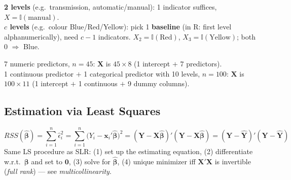 \begin{example}
    \textbf{2 levels} (e.g.\ transmission, automatic/manual): 1
    indicator suffices, $X=\mathbb{I}(\text{manual})$.
    \\ \textbf{$c$ levels} (e.g.\ colour Blue/Red/Yellow): pick 1
    \textbf{baseline} (in R: first level alphanumerically), need
    $c-1$ indicators. $X_2=\mathbb{I}(\text{Red})$, $X_3=\mathbb{I}(\text{Yellow})$;
    both 0 $\Rightarrow$ Blue.
\end{example}

\begin{example}\label{ex:dim}
    7 numeric predictors, $n=45$: $\mathbf{X}$ is $45\times8$ (1
    intercept $+$ 7 predictors). \\ 1 continuous predictor $+$ 1
    categorical predictor with 10 levels, $n=100$: $\mathbf{X}$ is
    $100\times11$ (1 intercept $+$ 1 continuous $+$ 9 dummy columns).
\end{example}


\subsection{Estimation via Least Squares}

\begin{definition}
    \[RSS(\hat{\boldsymbol\beta}) = \sum_{i=1}^n\hat\epsilon_i^2
    = \sum_{i=1}^n\big(Y_i-\mathbf{x}_i'\hat{\boldsymbol\beta}\big)^2
    = (\mathbf{Y}-\mathbf{X}\hat{\boldsymbol\beta})'(\mathbf{Y}-\mathbf{X}\hat{\boldsymbol\beta})
    = (\mathbf{Y}-\hat{\mathbf{Y}})'(\mathbf{Y}-\hat{\mathbf{Y}})\]
    Same LS procedure as SLR: (1) set up the estimating equation, (2)
    differentiate w.r.t.\ $\boldsymbol\beta$ and set to $\mathbf{0}$,
    (3) solve for $\hat{\boldsymbol\beta}$, (4) unique minimizer iff
    $\mathbf{X}'\mathbf{X}$ is invertible (\emph{full rank}) --- see
    \emph{multicollinearity}.
\end{definition}


